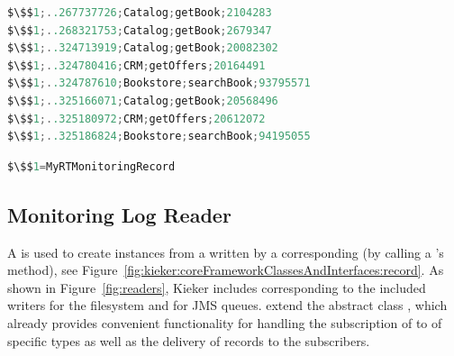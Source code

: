 \begin{minipage}{\columnwidth}
\begin{lstlisting}[language=Java, numbers=none, xleftmargin=0pt, caption=Filesystem Monitoring Log with Monitoring Records of type MyRTMonitoringRecord, label=lst:RTMonitoringLog, basicstyle=\ttfamily\footnotesize]
$\$$1;..267737726;Catalog;getBook;2104283
$\$$1;..268321753;Catalog;getBook;2679347
$\$$1;..324713919;Catalog;getBook;20082302
$\$$1;..324780416;CRM;getOffers;20164491
$\$$1;..324787610;Bookstore;searchBook;93795571
$\$$1;..325166071;Catalog;getBook;20568496
$\$$1;..325180972;CRM;getOffers;20612072
$\$$1;..325186824;Bookstore;searchBook;94195055
\end{lstlisting}

\begin{lstlisting}[language=Java, numbers=none, xleftmargin=0pt, caption=Mapping of Monitoring Record type identifier to implementing class, label=lst:RTMonitoringLogMapping, basicstyle=\ttfamily\small]
$\$$1=MyRTMonitoringRecord
\end{lstlisting}
\end{minipage}

\subsection{Monitoring Log Reader}

\noindent A \MonitoringLogReader{} is used to create \MonitoringRecord{} instances from %
a \MonitoringLog{} written by a corresponding \MonitoringLogWriter{} (by
calling a \MonitoringRecord{}'s  method), see Figure~\ref{fig:kieker:coreFrameworkClassesAndInterfaces:record}. %
As shown in Figure~\ref{fig:readers}, %
Kieker includes \MonitoringLogReaders{} corresponding to the included writers %
for the filesystem and for JMS queues. %
\MonitoringLogReaders{} extend the abstract class , %
which already provides convenient functionality for handling the subscription of %
\MonitoringRecordConsumers{} to \MonitoringRecords{} of specific types as well as %
the delivery of records to the subscribers. %

